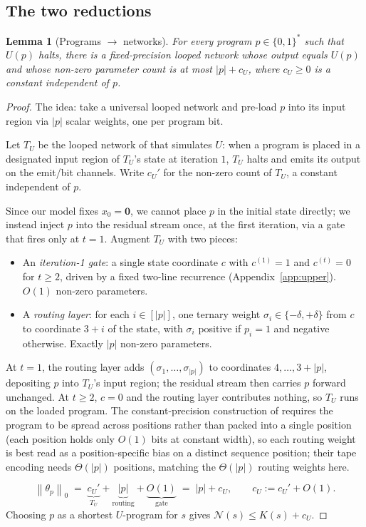 \documentclass{article}
\newtheorem{lemma}[theorem]{Lemma}
\theoremstyle{definition}
\newcommand{\B}{\{0,1\}}
\newcommand{\norm}[1]{\left\lVert#1\right\rVert}
\newcommand{\nc}{\mathcal{N}}
\begin{document}
\subsection{The two reductions}\label{sec:main:reductions}

\begin{lemma}[Programs $\to$ networks]\label{lem:upper}
  For every program $p \in \B^*$ such that $U(p)$ halts, there is a fixed-precision
  looped network whose output equals $U(p)$ and whose non-zero parameter count
  is at most $|p| + c_U$, where $c_U \ge 0$ is a constant independent of $p$.
\end{lemma}

\begin{proof}[Proof]
  The idea: take a universal looped network and pre-load $p$ into its input
  region via $|p|$ scalar weights, one per program bit.

  Let $T_U$ be the looped network of \citet{li2025constant,giannou2023looped}
  that simulates $U$: when a program is placed in a designated input region of
  $T_U$'s state at iteration $1$, $T_U$ halts and emits its output on the
  emit/bit channels. Write $c_U'$ for the non-zero count of $T_U$, a constant
  independent of $p$.

  Since our model fixes $x_0 = \mathbf{0}$, we cannot place $p$ in the initial
  state directly; we instead inject $p$ into the residual stream once, at the
  first iteration, via a gate that fires only at $t = 1$. Augment $T_U$ with two
  pieces:
  \begin{itemize}
    \item An \emph{iteration-1 gate}: a single state coordinate $c$ with $c^{(1)} = 1$
          and $c^{(t)} = 0$ for $t \ge 2$, driven by a fixed two-line recurrence
          (Appendix~\ref{app:upper}). $O(1)$ non-zero parameters.
    \item A \emph{routing layer}: for each $i \in [|p|]$, one ternary weight $\sigma_i
            \in \{-\delta, +\delta\}$ from $c$ to coordinate $3+i$ of the state, with
          $\sigma_i$ positive if $p_i = 1$ and negative otherwise. Exactly $|p|$ non-zero
          parameters.
  \end{itemize}
  At $t = 1$, the routing layer adds $(\sigma_1, \ldots, \sigma_{|p|})$ to
  coordinates $4, \ldots, 3 + |p|$, depositing $p$ into $T_U$'s input region;
  the residual stream then carries $p$ forward unchanged. At $t \ge 2$,
  $c = 0$ and the routing layer contributes nothing, so $T_U$ runs on the
  loaded program. The constant-precision construction of
  \citet{li2025constant} requires the program to be spread across positions
  rather than packed into a single position (each position holds only $O(1)$
  bits at constant width), so each routing weight is best read as a
  position-specific bias on a distinct sequence position; their tape encoding
  needs $\Theta(|p|)$ positions, matching the $\Theta(|p|)$ routing weights
  here.

  \[
    \norm{\theta_p}_0 \;=\; \underbrace{c_U'}_{T_U} + \underbrace{|p|}_{\text{routing}} + \underbrace{O(1)}_{\text{gate}} \;=\; |p| + c_U, \qquad c_U := c_U' + O(1).
  \]
  Choosing $p$ as a shortest $U$-program for $s$ gives $\nc(s) \le K(s) + c_U$.
\end{proof}
\end{document}
